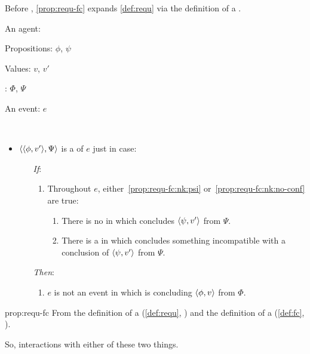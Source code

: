 \begin{note}
  Before , \autoref{prop:requ-fc} expands \autoref{def:requ} via the definition of a \fc{}.

  \begin{proposition}
    \label{prop:requ-fc}
    \begin{itemize*}[noitemsep, label=\(\circ\)]
    \item
      An agent: \vAgent{}
    \item
      Propositions: \(\phi\), \(\psi\)
    \item
      Values: \(v\), \(v'\)
    \item
      : \(\Phi\), \(\Psi\)
    \item
      An event: \(e\)
    \item
      \mbox{ }
    \end{itemize*}

    \begin{itemize}
    \item
      \(\langle \langle \phi, v' \rangle, \Psi \rangle\) is a \emph{\requ{}} of \(e\) just in case:
      \begin{itemize}
      \item[\emph{If}:]
        \begin{enumerate}[label=\alph*., ref=(\alph*), series=requDefSeries]
        \item
          \label{prop:requ-fc:nk}
          Throughout \(e\), either~\ref{prop:requ-fc:nk:psi} or~\ref{prop:requ-fc:nk:no-conf} are true:
          \begin{enumerate}[label=\roman*., ref=(\roman*)]
          \item
            \label{prop:requ-fc:nk:psi}
            There is no \pevent{} in which \vAgent{} concludes \(\langle \psi, v' \rangle\) from \(\Psi\).
          \item
            \label{prop:requ-fc:nk:no-conf}
            There is a \pevent{} in which \vAgent{} concludes something incompatible with a conclusion of \(\langle \psi, v' \rangle\) from \(\Psi\).
          \end{enumerate}
        \end{enumerate}
      \item[\emph{Then}:]
        \begin{enumerate}[label=\alph*., ref=(\alph*), resume*=requDefSeries]
        \item
          \label{prop:requ-fc:ne}
          \(e\) is not an event in which \vAgent{} is concluding \(\langle \phi, v \rangle\) from \(\Phi\).
        \end{enumerate}
      \end{itemize}
    \end{itemize}
    \vspace{-\baselineskip}
  \end{proposition}

  \begin{argument}{prop:requ-fc}
    From the definition of a \requ{} (\autoref{def:requ}, ) and the definition of a \fc{} (\autoref{def:fc}, ).
  \end{argument}
  So, interactions with either of these two things.
\end{note}

